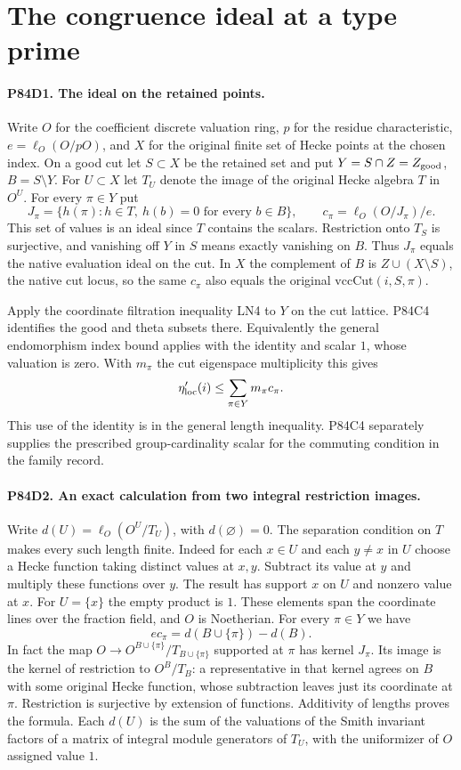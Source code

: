 \section{The congruence ideal at a type prime}

\paragraph{P84D1. The ideal on the retained points.}
Write $O$ for the coefficient discrete valuation ring, $p$ for
the residue characteristic, $e=\ell_O(O/pO)$, and $X$ for
the original finite set of Hecke points at the chosen index.
On a good cut let $S\subset X$ be the retained set and put
$Y=S\cap Z=Z_{\rm good}$, $B=S\setminus Y$.
For $U\subset X$ let $T_U$ denote the image of the original
Hecke algebra $T$ in $O^U$. For every $\pi\in Y$ put
\[
 J_\pi=\{h(\pi):h\in T,\ h(b)=0\text{ for every }b\in B\},
 \qquad c_\pi=\ell_O(O/J_\pi)/e .
\]
This set of values is an ideal since $T$ contains the scalars.
Restriction onto $T_S$ is surjective, and vanishing off $Y$ in
$S$ means exactly vanishing on $B$. Thus $J_\pi$ equals the
native evaluation ideal on the cut. In $X$ the complement of $B$
is $Z\cup(X\setminus S)$, the native cut locus, so the same
$c_\pi$ also equals the original $\mathrm{vccCut}(i,S,\pi)$.

Apply the coordinate filtration inequality LN4 to $Y$ on the
cut lattice. P84C4 identifies the good and theta subsets there.
Equivalently the general endomorphism index bound applies with
the identity and scalar $1$, whose valuation is zero. With $m_\pi$
the cut eigenspace multiplicity this gives
\[
                  \eta'_{\rm loc}(i)\le\sum_{\pi\in Y}m_\pi c_\pi .
\]
This use of the identity is in the general length inequality.
P84C4 separately supplies the prescribed group-cardinality
scalar for the commuting condition in the family record.

\paragraph{P84D2. An exact calculation from two integral restriction images.}
Write $d(U)=\ell_O(O^U/T_U)$, with $d(\varnothing)=0$.
The separation condition on $T$ makes every such length finite.
Indeed for each $x\in U$ and each $y\ne x$ in $U$ choose a
Hecke function taking distinct values at $x,y$. Subtract its
value at $y$ and multiply these functions over $y$. The result
has support $x$ on $U$ and nonzero value at $x$. For
$U=\{x\}$ the empty product is $1$. These elements span the
coordinate lines over the fraction field, and $O$ is Noetherian.
For every $\pi\in Y$ we have
\[
           e c_\pi=d(B\cup\{\pi\})-d(B).
\]
In fact the map $O\to O^{B\cup\{\pi\}}/T_{B\cup\{\pi\}}$
supported at $\pi$ has kernel $J_\pi$. Its image is the kernel
of restriction to $O^B/T_B$: a representative in that kernel
agrees on $B$ with some original Hecke function, whose subtraction
leaves just its coordinate at $\pi$. Restriction is surjective
by extension of functions. Additivity of lengths proves the
formula. Each $d(U)$ is the sum of the valuations of the
Smith invariant factors of a matrix of integral module generators
of $T_U$, with the uniformizer of $O$ assigned value $1$.

